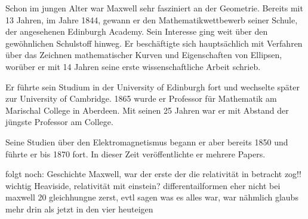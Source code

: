Schon im jungen Alter war Maxwell sehr fasziniert an der Geometrie. Bereits mit 13 Jahren, im Jahre 1844, gewann er den Mathematikwettbewerb seiner Schule, der angesehenen Edinburgh Academy.
Sein Interesse ging weit über den gewöhnlichen Schulstoff hinweg.
Er beschäftigte sich hauptsächlich mit Verfahren über das Zeichnen mathematischer Kurven und Eigenschaften von Ellipsen, worüber er mit 14 Jahren seine erste wissenschaftliche Arbeit schrieb.

Er führte sein Studium in der University of Edinburgh fort und wechselte später zur University of Cambridge.
1865 wurde er Professor für Mathematik am Marischal College in Aberdeen.
Mit seinen 25 Jahren war er mit Abstand der jüngste Professor am College.%

Seine Studien über den Elektromagnetismus begann er aber bereits 1850 und führte er bis 1870 fort. In dieser Zeit veröffentlichte er mehrere Papers.

 



folgt noch: Geschichte Maxwell, war der erste der die relativität in betracht zog!! wichtig
Heaviside,
relativität mit einstein?
differentailformen eher nicht
bei maxwell 20 gleichhungne zerst, evtl sagen was es alles war, war nähmlich glaubs mehr drin als jetzt in den vier heuteigen




